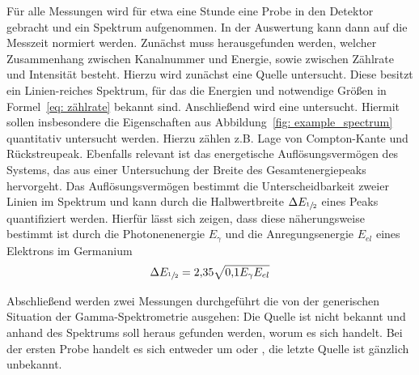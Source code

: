 Für alle Messungen wird für etwa eine Stunde eine Probe in den Detektor gebracht und ein Spektrum aufgenommen. In der 
Auswertung kann dann auf die Messzeit normiert werden. 
Zunächst muss herausgefunden werden, welcher Zusammenhang zwischen Kanalnummer und Energie, sowie zwischen Zählrate und 
Intensität besteht. Hierzu wird zunächst eine  Quelle untersucht. Diese besitzt ein Linien-reiches Spektrum, für das 
die Energien und notwendige Größen in Formel~\eqref{eq: zählrate} bekannt sind. 
Anschließend wird eine  untersucht. Hiermit sollen insbesondere die Eigenschaften aus 
Abbildung~\ref{fig: example_spectrum} quantitativ untersucht werden. Hierzu zählen z.B. Lage von Compton-Kante und 
Rückstreupeak. Ebenfalls relevant ist das energetische Auflösungsvermögen des Systems, das aus einer Untersuchung der Breite 
des Gesamtenergiepeaks hervorgeht. Das Auflösungsvermögen bestimmt die Unterscheidbarkeit zweier Linien im Spektrum und kann durch 
die Halbwertbreite $\Delta E_{\sfrac{1}{2}}$ eines Peaks quantifiziert werden. Hierfür lässt sich zeigen, dass diese 
näherungsweise bestimmt ist durch die Photonenenergie $E_\gamma$ und die Anregungsenergie $E_{el}$ eines Elektrons im Germanium 
\begin{equation}
    \Delta E_{\sfrac{1}{2}} = \num{2.35}\sqrt{\num{0.1}E_\gamma E_{el}}
    \label{eq: E_fwhm}
\end{equation}

Abschließend werden zwei Messungen durchgeführt die von der generischen Situation der Gamma-Spektrometrie ausgehen: 
Die Quelle ist nicht bekannt und anhand des Spektrums soll heraus gefunden werden, worum es sich handelt. Bei der ersten 
Probe handelt es sich entweder um  oder , die letzte Quelle ist gänzlich unbekannt.